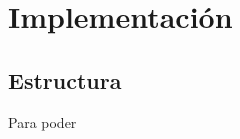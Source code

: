 \chapter{Implementación}
\label{ch:implementacion}

\section{Estructura}
\label{ch:implementacion:sec:estructura}

Para poder
